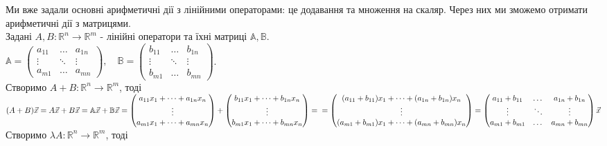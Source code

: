 \documentclass[a4paper, 10pt]{article}
\theoremstyle{theoremdd}
\begin{document}
	Ми вже задали основні арифметичні дії з лінійними операторами: це додавання та множення на скаляр. Через них ми зможемо отримати арифметичні дії з матрицями.\\
	Задані $A,B \colon \mathbb{R}^n \to \mathbb{R}^m$ - лінійні оператори та їхні матриці $\mathbb{A}, \mathbb{B}$.\\
	$\mathbb{A} = \begin{pmatrix}
	a_{11} & \dots & a_{1n} \\
	\vdots & \ddots & \vdots \\
	a_{m1} & \dots & a_{mn}
	\end{pmatrix}, \quad \mathbb{B} = \begin{pmatrix}
	b_{11} & \dots & b_{1n} \\
	\vdots & \ddots & \vdots \\
	b_{m1} & \dots & b_{mn}
	\end{pmatrix}$.\\
	Створимо $A+B \colon \mathbb{R}^n \to \mathbb{R}^m$, тоді\\
	$(A+B)\vec{x} = A \vec{x} + B \vec{x} = \mathbb{A} \vec{x} + \mathbb{B} \vec{x} = \begin{pmatrix}
	a_{11}x_1 + \dots + a_{1n} x_n \\
	\vdots \\
	a_{m1}x_1 + \dots + a_{mn} x_n \\
	\end{pmatrix} + \begin{pmatrix}
	b_{11}x_1 + \dots + b_{1n} x_n \\
	\vdots \\
	b_{m1}x_1 + \dots + b_{mn} x_n \\
	\end{pmatrix} = \\
	= \begin{pmatrix}
	(a_{11}+b_{11})x_1 + \dots + (a_{1n}+b_{1n}) x_n \\
	\vdots \\
	(a_{m1} + b_{m1})x_1 + \dots + (a_{mn}+b_{mn}) x_n \\
	\end{pmatrix} = \begin{pmatrix}
	a_{11} + b_{11} & \dots & a_{1n} + b_{1n} \\
	\vdots & \ddots & \vdots \\
	a_{m1} + b_{m1} & \dots & a_{mn} + b_{mn}
	\end{pmatrix} \vec{x}$
	\bigskip \\
	Створимо $\lambda A \colon \mathbb{R}^n \to \mathbb{R}^m$, тоді\\
\end{document}
